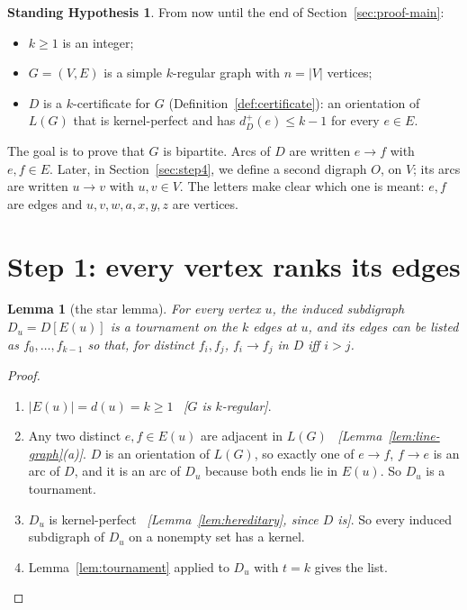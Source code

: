\documentclass[11pt]{article}
\theoremstyle{plain}
\newtheorem{lemma}[theorem]{Lemma}
\theoremstyle{definition}
\newtheorem{hypothesis}[theorem]{Standing Hypothesis}
\theoremstyle{remark}
\newcommand{\LG}{L(G)}
\newcommand{\st}[1]{E(#1)}
\newcommand{\dout}{d^{+}}
\newcommand{\why}[1]{\unskip\ \textit{[#1]}}
\newenvironment{steps}{\begin{enumerate}[label=(\arabic*),leftmargin=2.2em,itemsep=0.35em]}{\end{enumerate}}
\begin{document}
\begin{hypothesis}\label{hyp:main}
From now until the end of Section~\ref{sec:proof-main}:
\begin{itemize}
  \item $k\ge 1$ is an integer;
  \item $G=(V,E)$ is a simple $k$-regular graph with $n=|V|$ vertices;
  \item $D$ is a $k$-certificate for $G$ (Definition~\ref{def:certificate}): an orientation of
    $\LG$ that is kernel-perfect and has $\dout_D(e)\le k-1$ for every $e\in E$.
\end{itemize}
\end{hypothesis}

The goal is to prove that $G$ is bipartite. Arcs of $D$ are written $e\to f$ with $e,f\in E$.
Later, in Section~\ref{sec:step4}, we define a second digraph $O$, on $V$; its arcs are written
$u\to v$ with $u,v\in V$. The letters make clear which one is meant: $e,f$ are edges and
$u,v,w,a,x,y,z$ are vertices.

\section{Step 1: every vertex ranks its edges}\label{sec:step1}

\begin{lemma}[the star lemma]\label{lem:star}
For every vertex $u$, the induced subdigraph $D_u=D[\st{u}]$ is a tournament on the $k$ edges at
$u$, and its edges can be listed as $f_0,\dots,f_{k-1}$ so that, for distinct $f_i,f_j$,
$f_i\to f_j$ in $D$ iff $i>j$.
\end{lemma}

\begin{proof}
\begin{steps}
  \item $|\st{u}|=d(u)=k\ge 1$ \why{$G$ is $k$-regular}.
  \item Any two distinct $e,f\in\st{u}$ are adjacent in $\LG$
    \why{Lemma~\ref{lem:line-graph}(a)}. $D$ is an orientation of $\LG$, so exactly one of
    $e\to f$, $f\to e$ is an arc of $D$, and it is an arc of $D_u$ because both ends lie in
    $\st{u}$. So $D_u$ is a tournament.
  \item $D_u$ is kernel-perfect \why{Lemma~\ref{lem:hereditary}, since $D$ is}. So every
    induced subdigraph of $D_u$ on a nonempty set has a kernel.
  \item Lemma~\ref{lem:tournament} applied to $D_u$ with $t=k$ gives the list. \qedhere
\end{steps}
\end{proof}
\end{document}
